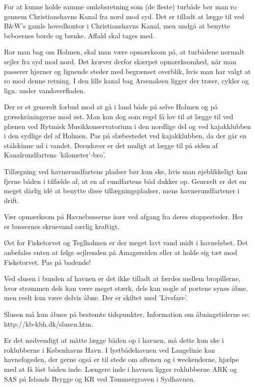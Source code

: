 \documentclass{article}
\begin{document}
For at kunne holde samme omløbsretning som (de fleste) turbåde bør man ro
gennem Christianshavns Kanal fra nord mod syd. Det er tilladt at lægge
til ved B\&W’s gamle hovedkontor i Christianshavns Kanal, men undgå at
benytte beboernes borde og bænke. Affald skal tages med.

Ror man bag om Holmen, skal man være opmærksom på, at turbådene normalt
sejler fra syd mod nord. Det kræver derfor skærpet opmærksomhed, når man
passerer hjørner og lignende steder med begrænset overblik, hvis man har
valgt at ro mod denne retning.  I den lille kanal bag Arsenaløen ligger
der træer, cykler og lign. under vandoverfladen.

Der er et generelt forbud mod at gå i land både på selve Holmen og på
græsskråningerne mod øst. Man kan dog som regel få lov til at lægge til
ved plænen ved Rytmisk Musikkonservatorium i den nordlige del og ved
kajakklubben i den sydlige del af Holmen. Pas på slæbestedet ved
kajakklubben, da der går en stålskinne ud i vandet. Derudover er det
muligt at lægge til på siden af Kanalrundfartens ’kilometer’-bro’.

Tillægning ved havnerundfartens pladser bør kun ske, hvis man
øjeblikkeligt kan fjerne båden i tilfælde af, at en af rundfartens båd
dukker op. Generelt er det en meget dårlig idé at benytte disse
tillægningspladser, mens havnerundfartener i drift.

Vær opmærksom på Havnebusserne især ved afgang fra deres stoppesteder.
Her er bussernes skruevand særlig kraftigt.

Øst for Fisketorvet og Teglholmen er der meget lavt vand midt i
havneløbet. Det anbefales enten at følge sejlrenden på Amagersiden eller
at holde sig tæt mod Fisketorvet. Pas på badende!

Ved slusen i bunden af havnen er det ikke tilladt at færdes mellem
bropillerne, hvor strømmen dels kan være meget stærk, dels kan nogle af
portene synes åbne, men reelt kun være delvis åbne. Der er skiltet med
’Livsfare’.

Slusen må kun åbnes på bestemte tidspunkter. Information om
åbningstiderne se: http://kb-kbh.dk/slusen.htm.

Er det nødvendigt at måtte lægge båden op i havnen, må dette kun ske i
roklubberne i Københavns Havn. I lystbådehavnen ved Langelinie kan
havnefogeden, der gerne også er til stede om aftenen og i weekenderne,
hjælpe med at få låst båden inde. Længere inde i havnen ligger
roklubberne ARK og SAS på Islands Brygge og KR ved Tømmergraven i
Sydhavnen.
\end{document}
